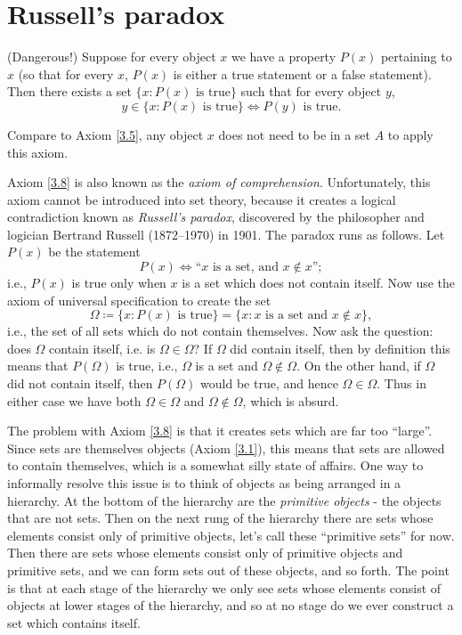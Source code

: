 \section{Russell's paradox}

\begin{axiom}\label{3.8}
(Dangerous!)
Suppose for every object \(x\) we have a property \(P(x)\) pertaining to \(x\) (so that for every \(x\), \(P(x)\) is either a true statement or a false statement).
Then there exists a set \(\{x : P(x) \text{ is true}\}\) such that for every object \(y\),
\[
    y \in \{x : P(x) \text{ is true}\} \iff P(y) \text{ is true}.
\]
\end{axiom}

\begin{note}
Compare to Axiom \ref{3.5}, any object \(x\) does not need to be in a set \(A\) to apply this axiom.
\end{note}

\begin{note}
Axiom \ref{3.8} is also known as the \emph{axiom of comprehension}.
Unfortunately, this axiom cannot be introduced into set theory, because it creates a logical contradiction known as \emph{Russell’s paradox}, discovered by the philosopher and logician Bertrand Russell (1872--1970) in 1901.
The paradox runs as follows.
Let \(P(x)\) be the statement
\[
    P(x) \iff \text{``\(x\) is a set, and \(x \notin x\)''};
\]
i.e., \(P(x)\) is true only when \(x\) is a set which does not contain itself.
Now use the axiom of universal specification to create the set
\[
    \Omega \coloneqq \{x : P(x) \text{ is true}\} = \{x : x \text{ is a set and } x \notin x\},
\]
i.e., the set of all sets which do not contain themselves.
Now ask the question: does \(\Omega\) contain itself, i.e. is \(\Omega \in \Omega\)?
If \(\Omega\) did contain itself, then by definition this means that \(P(\Omega)\) is true, i.e., \(\Omega\) is a set and \(\Omega \notin \Omega\).
On the other hand, if \(\Omega\) did not contain itself, then \(P(\Omega)\) would be true, and hence \(\Omega \in \Omega\).
Thus in either case we have both \(\Omega \in \Omega\) and \(\Omega \notin \Omega\), which is absurd.
\end{note}

\begin{note}
The problem with Axiom \ref{3.8} is that it creates sets which are far too ``large''.
Since sets are themselves objects (Axiom \ref{3.1}), this means that sets are allowed to contain themselves, which is a somewhat silly state of affairs.
One way to informally resolve this issue is to think of objects as being arranged in a hierarchy.
At the bottom of the hierarchy are the \emph{primitive objects} - the objects that are not sets.
Then on the next rung of the hierarchy there are sets whose elements consist only of primitive objects, let’s call these ``primitive sets'' for now.
Then there are sets whose elements consist only of primitive objects and primitive sets, and we can form sets out of these objects, and so forth.
The point is that at each stage of the hierarchy we only see sets whose elements consist of objects at lower stages of the hierarchy, and so at no stage do we ever construct a set which contains itself.
\end{note}


